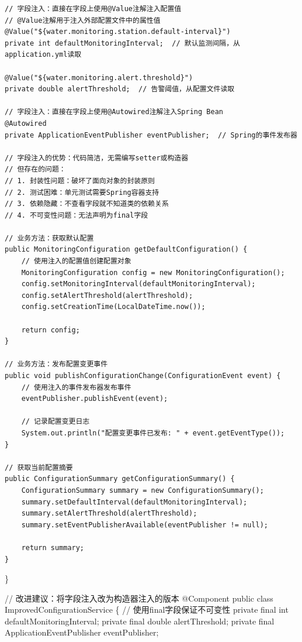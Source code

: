 \begin{verbatim}
// 字段注入：直接在字段上使用@Value注解注入配置值
// @Value注解用于注入外部配置文件中的属性值
@Value("${water.monitoring.station.default-interval}")  
private int defaultMonitoringInterval;  // 默认监测间隔，从application.yml读取

@Value("${water.monitoring.alert.threshold}")  
private double alertThreshold;  // 告警阈值，从配置文件读取

// 字段注入：直接在字段上使用@Autowired注解注入Spring Bean
@Autowired
private ApplicationEventPublisher eventPublisher;  // Spring的事件发布器

// 字段注入的优势：代码简洁，无需编写setter或构造器
// 但存在的问题：
// 1. 封装性问题：破坏了面向对象的封装原则
// 2. 测试困难：单元测试需要Spring容器支持
// 3. 依赖隐藏：不查看字段就不知道类的依赖关系
// 4. 不可变性问题：无法声明为final字段

// 业务方法：获取默认配置
public MonitoringConfiguration getDefaultConfiguration() {
    // 使用注入的配置值创建配置对象
    MonitoringConfiguration config = new MonitoringConfiguration();
    config.setMonitoringInterval(defaultMonitoringInterval);
    config.setAlertThreshold(alertThreshold);
    config.setCreationTime(LocalDateTime.now());
    
    return config;
}

// 业务方法：发布配置变更事件
public void publishConfigurationChange(ConfigurationEvent event) {
    // 使用注入的事件发布器发布事件
    eventPublisher.publishEvent(event);
    
    // 记录配置变更日志
    System.out.println("配置变更事件已发布: " + event.getEventType());
}

// 获取当前配置摘要
public ConfigurationSummary getConfigurationSummary() {
    ConfigurationSummary summary = new ConfigurationSummary();
    summary.setDefaultInterval(defaultMonitoringInterval);
    summary.setAlertThreshold(alertThreshold);
    summary.setEventPublisherAvailable(eventPublisher != null);
    
    return summary;
}
\end{verbatim}

\}

// 改进建议：将字段注入改为构造器注入的版本 @Component public class ImprovedConfigurationService \{ // 使用final字段保证不可变性 private final int defaultMonitoringInterval; private final double alertThreshold; private final ApplicationEventPublisher eventPublisher;

